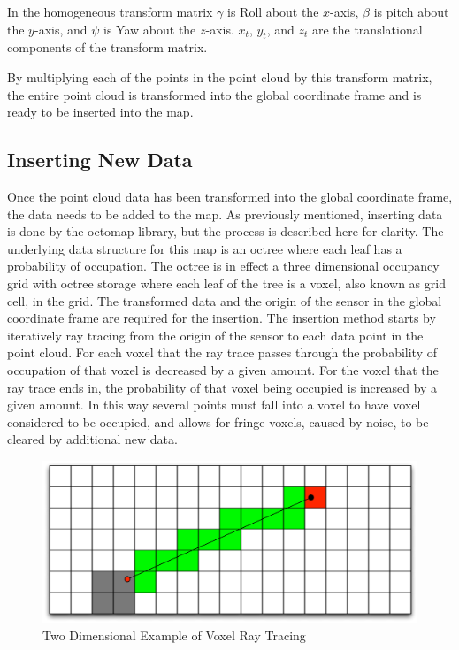 \documentclass[12pt]{report}
\begin{document}
In the homogeneous transform matrix $\gamma$ is Roll about the $x$-axis, $\beta$ is pitch about the $y$-axis, and $\psi$ is Yaw about the $z$-axis.  $x_{t}$, $y_{t}$, and $z_{t}$ are the translational components of the transform matrix.

By multiplying each of the points in the point cloud by this transform matrix, the entire point cloud is transformed into the global coordinate frame and is ready to be inserted into the map.

\subsection{Inserting New Data}
Once the point cloud data has been transformed into the global coordinate frame, the data needs to be added to the map. As previously mentioned, inserting data is done by the octomap library, but the process is described here for clarity. The underlying data structure for this map is an octree where each leaf has a probability of occupation. The octree is in effect a three dimensional occupancy grid with octree storage where each leaf of the tree is a voxel, also known as grid cell, in the grid. The transformed data and the origin of the sensor in the global coordinate frame are required for the insertion. The insertion method starts by iteratively ray tracing from the origin of the sensor to each data point in the point cloud.  For each voxel that the ray trace passes through the probability of occupation of that voxel is decreased by a given amount. For the voxel that the ray trace ends in, the probability of that voxel being occupied is increased by a given amount. In this way several points must fall into a voxel to have voxel considered to be occupied, and allows for fringe voxels, caused by noise, to be cleared by additional new data.

\begin{figure}[ht]
  \centering
  \includegraphics[width=5in,keepaspectratio]{raytrace.pdf}
  \caption{Two Dimensional Example of Voxel Ray Tracing}
  \label{fig:voxel_raytrace}
\end{figure}
\end{document}
